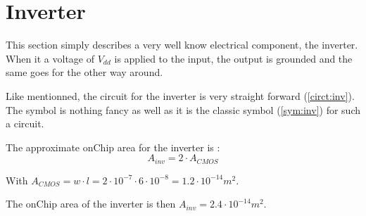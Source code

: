 \section{Inverter}
\label{sec:inv}

This section simply describes a very well know electrical component, the inverter. When it a voltage of $V_{dd}$ is applied to the input, the output is grounded and the same goes for the other way around.

\begin{figure}[H]
  \centering
  \hspace*{2.5cm}
  \hfill
  \hspace*{1.5cm}
  \caption{}
  \label{fig:inv}
\end{figure}

Like mentionned, the circuit for the inverter is very straight forward (\cref{circt:inv}). The symbol is nothing fancy as well as it is the classic symbol (\cref{sym:inv}) for such a circuit.

The approximate onChip area for the inverter is :
\begin{equation}
  A_{inv}=2\cdot A_{CMOS}
\end{equation}

With $A_{CMOS}= w\cdot l=2\cdot 10^{-7}\cdot6\cdot10^{-8} =1.2\cdot10^{-14}m^2$.

The onChip area of the inverter is then $A_{inv}=2.4\cdot10^{-14}m^2$.
